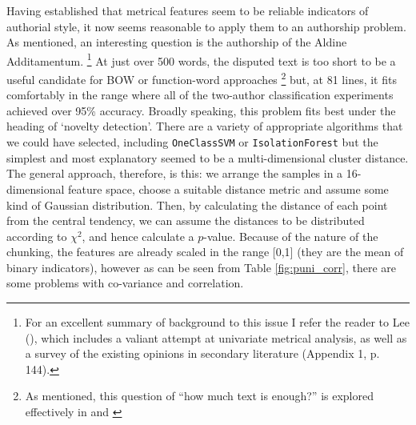 \documentclass[11pt,a4paper]{scrartcl} %
\begin{document}
{Having established that metrical features seem to be reliable indicators of authorial style, it now seems reasonable to apply them to an authorship problem. As mentioned, an interesting question is the authorship of the Aldine Additamentum.%
\footnote{For an excellent summary of background to this issue I refer the reader to Lee (\citeyear[20-9]{lee_silius_2017}), which includes a valiant attempt at univariate metrical analysis, as well as a survey of the existing opinions in secondary literature (Appendix 1, p. 144).}
At just over 500 words, the disputed text is too short to be a useful candidate for BOW or function-word approaches%
\footnote{As mentioned, this question of ``how much text is enough?'' is explored effectively in \cite{eder_does_2015} and \cite{eder_short_2017}}
but, at 81 lines, it fits comfortably in the range where all of the two-author classification experiments achieved over 95\% accuracy. Broadly speaking, this problem fits best under the heading of `novelty detection'. There are a variety of appropriate algorithms that we could have selected, including \texttt{OneClassSVM} or \texttt{IsolationForest} but the simplest and most explanatory seemed to be a multi-dimensional cluster distance. The general approach, therefore, is this: we arrange the samples in a 16-dimensional feature space, choose a suitable distance metric and assume some kind of Gaussian distribution. Then, by calculating the distance of each point from the central tendency, we can assume the distances to be distributed according to $\chi^{2}$, and hence calculate a $p$-value. Because of the nature of the chunking, the features are already scaled in the range [0,1] (they are the mean of binary indicators), however as can be seen from Table \ref{fig:puni_corr}, there are some problems with co-variance and correlation.
\begin{table}
\caption{Some highly correlated features in Silius' \textit{Punica}}
\label{fig:puni_corr}
\phantom{x}
\centering
{}
\end{table}}
\end{document}
